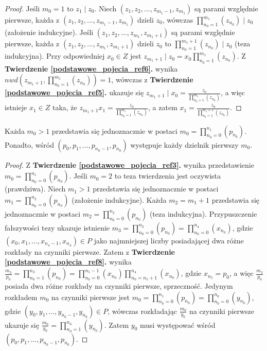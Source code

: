 \begin{appendices}
\begin{theorem}
\begin{proof}
Jeśli $m_0 = 1$ to $z_1 \mid z_0$. Niech $(z_1, z_2, ..., z_{m_1 - 1}, z_{m_1})$ są parami względnie pierwsze, każda z $(z_1, z_2, ..., z_{m_1 - 1}, z_{m_1})$ dzieli $z_0$, wówczas $\prod_{n_0 = 1}^{m_1}(z_{n_0}) \mid z_0$ (założenie indukcyjne). Jeśli $(z_1, z_2, ..., z_{m_1}, z_{m_1 + 1})$ są parami względnie pierwsze, każda z $(z_1, z_2, ..., z_{m_1}, z_{m_1 + 1})$ dzieli $z_0$ to $\prod_{n_0 = 1}^{m_1 + 1}(z_{n_0}) \mid z_0$ (teza indukcyjna). Przy odpowiedniej $x_0 \in Z$ jest $z_{m_1 + 1} \mid z_0 = x_0\prod_{n_0 = 1}^{m_1}(z_{n_0})$. Z \textbf{Twierdzenie \ref{podstawowe_pojecia_ref6}.} wynika $nwd(z_{m_1 + 1}, \prod_{n_0 = 1}^{m_1}(z_{n_0})) = 1$, wówczas z \textbf{Twierdzenie \ref{podstawowe_pojecia_ref5}.} ukazuje się $z_{m_1 + 1} \mid x_0 = \frac{z_0}{\prod_{n_0 = 1}^{m_1}(z_{n_0})}$, a więc istnieje $x_1 \in Z$ taka, że $z_{m_1 + 1}x_1 = \frac{z_0}{\prod_{n_0 = 1}^{m_1}(z_{n_0})}$, a zatem $x_1 = \frac{z_0}{\prod_{n_0 = 1}^{m_1 + 1}(z_{n_0})}$.
\end{proof}
\end{theorem}
\begin{theorem}
Każda $m_0 > 1$ przedstawia się jednoznacznie w postaci $m_0 = \prod_{n_0 = 0}^{n_1}(p_{n_0})$. Ponadto, wśród $(p_0, p_1, ..., p_{n_0 - 1}, p_{n_0})$ występuje każdy dzielnik pierwszy $m_0$.
\begin{proof}
Z \textbf{Twierdzenie \ref{podstawowe_pojecia_ref3}.} wynika przedstawienie $m_0 = \prod_{n_0 = 0}^{n_1}(p_{n_0})$. Jeśli $m_0 = 2$ to teza twierdzenia jest oczywista (prawdziwa). Niech $m_1 > 1$ przedstawia się jednoznacznie w postaci $m_1 = \prod_{n_0 = 0}^{n_2}(p_{n_0})$ (założenie indukcyjne). Każda $m_2 = m_1 + 1$ przedstawia się jednoznacznie w postaci $m_2 = \prod_{n_0 = 0}^{n_2}(p_{n_0})$ (teza indukcyjna). Przypuszczenie fałszywości tezy ukazuje istnienie $m_3 = \prod_{n_0 = 0}^{n_3}(p_{n_0}) = \prod_{n_0 = 0}^{n_4}(x_{n_0})$, gdzie $(x_0, x_1, ..., x_{n_4 - 1}, x_{n_4}) \in P$ jako najmniejszej liczby posiadającej dwa różne rozkłady na czynniki pierwsze. Zatem z \textbf{Twierdzenie \ref{podstawowe_pojecia_ref8}.} wynika $\frac{m_3}{p_0} = \prod_{n_0 = 1}^{n_3}(p_{n_0}) = \prod_{n_0 = 0}^{n_5 - 1}(x_{n_0})\prod_{n_0 = n_5 + 1}^{n_4}(x_{n_0})$, gdzie $x_{n_5} = p_0$, a więc $\frac{m_3}{p_0}$ posiada dwa różne rozkłady na czynniki pierwsze, sprzeczność. Jedynym rozkładem $m_0$ na czynniki pierwsze jest $m_0 = \prod_{n_0 = 0}^{n_1}(p_{n_0}) = \prod_{n_0 = 0}^{n_6}(y_{n_0})$, gdzie $(y_0, y_1, ..., y_{n_6 - 1}, y_{n_6}) \in P$, wówczas rozkładając $\frac{m_0}{y_0}$ na czynniki pierwsze ukazuje się $\frac{m_0}{y_0} = \prod_{n_0 = 1}^{n_6}(y_{n_0})$. Zatem $y_0$ musi występować wśród $(p_0, p_1, ..., p_{n_0 - 1}, p_{n_0})$.

\end{proof}
\end{theorem}
\end{appendices}
